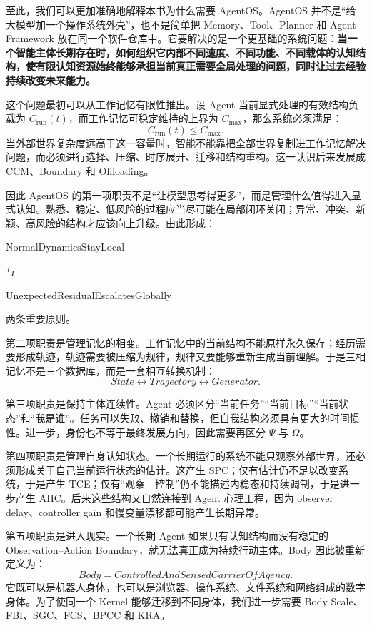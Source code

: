 至此，我们可以更加准确地解释本书为什么需要 AgentOS。AgentOS 并不是“给大模型加一个操作系统外壳”，也不是简单把 Memory、Tool、Planner 和 Agent Framework 放在同一个软件仓库中。它要解决的是一个更基础的系统问题：\textbf{当一个智能主体长期存在时，如何组织它内部不同速度、不同功能、不同载体的认知结构，使有限认知资源始终能够承担当前真正需要全局处理的问题，同时让过去经验持续改变未来能力。}

这个问题最初可以从工作记忆有限性推出。设 Agent 当前显式处理的有效结构负载为 $C_{\mathrm{run}}(t)$，而工作记忆可稳定维持的上界为 $C_{\max}$，那么系统必须满足：
\[
C_{\mathrm{run}}(t)
\le
C_{\max}.
\]
当外部世界复杂度远高于这一容量时，智能不能靠把全部世界复制进工作记忆解决问题，而必须进行选择、压缩、时序展开、迁移和结构重构。这一认识后来发展成 CCM、Boundary 和 Offloading。

因此 AgentOS 的第一项职责不是“让模型思考得更多”，而是管理什么值得进入显式认知。熟悉、稳定、低风险的过程应当尽可能在局部闭环关闭；异常、冲突、新颖、高风险的结构才应该向上升级。由此形成：
\begin{statementbox}
NormalDynamicsStayLocal
\end{statementbox}
与
\begin{statementbox}
UnexpectedResidualEscalatesGlobally
\end{statementbox}
两条重要原则。

第二项职责是管理记忆的相变。工作记忆中的当前结构不能原样永久保存；经历需要形成轨迹，轨迹需要被压缩为规律，规律又要能够重新生成当前理解。于是三相记忆不是三个数据库，而是一套相互转换机制：
\[
State
\leftrightarrow
Trajectory
\leftrightarrow
Generator.
\]

第三项职责是保持主体连续性。Agent 必须区分“当前任务”“当前目标”“当前状态”和“我是谁”。任务可以失败、撤销和替换，但自我结构必须具有更大的时间惯性。进一步，身份也不等于最终发展方向，因此需要再区分 $\Psi$ 与 $\Omega$。

第四项职责是管理自身认知状态。一个长期运行的系统不能只观察外部世界，还必须形成关于自己当前运行状态的估计。这产生 SPC；仅有估计仍不足以改变系统，于是产生 TCE；仅有“观察—控制”仍不能描述内稳态和持续调制，于是进一步产生 AHC。后来这些结构又自然连接到 Agent 心理工程，因为 observer delay、controller gain 和慢变量漂移都可能产生长期异常。

第五项职责是进入现实。一个长期 Agent 如果只有认知结构而没有稳定的 Observation--Action Boundary，就无法真正成为持续行动主体。Body 因此被重新定义为：
\[
Body
=
ControlledAndSensedCarrierOfAgency.
\]
它既可以是机器人身体，也可以是浏览器、操作系统、文件系统和网络组成的数字身体。为了使同一个 Kernel 能够迁移到不同身体，我们进一步需要 Body Scale、FBI、SGC、FCS、BPCC 和 KRA。

